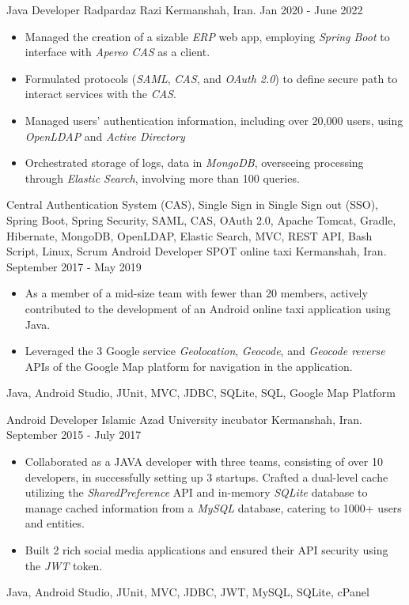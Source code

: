 \begin{experiences}
\experience
{}
{Java Developer}
{Radpardaz Razi}
{Kermanshah, Iran. \hspace{190 pt} Jan 2020 - June 2022}
{}
{
\begin{itemize}
\item Managed the creation of a sizable \emph{ERP} web app, employing \emph{Spring Boot} to interface with \emph{Apereo CAS} as a client.
\item Formulated protocols (\emph{SAML}, \emph{CAS}, and \emph{OAuth 2.0}) to define secure path to interact services with the \textit{CAS}.
\item Managed users' authentication information, including over 20,000 users, using \emph{OpenLDAP} and \emph{Active Directory}
\item Orchestrated storage of logs, data in \emph{MongoDB}, overseeing processing through \emph{Elastic Search}, involving more than 100 queries.
\end{itemize}
}
{Central Authentication System (CAS), Single Sign in Single Sign out (SSO), Spring Boot, Spring Security, SAML, CAS, OAuth 2.0, Apache Tomcat, Gradle, Hibernate, MongoDB, OpenLDAP, Elastic Search, MVC, REST API, Bash Script, Linux, Scrum}
\emptySeparator
\experience
  {}
  {Android Developer }
  {SPOT online taxi}
  {Kermanshah, Iran. \hspace{140 pt} September 2017 - May 2019}
  {}
  {
  \begin{itemize}
    \item As a member of a mid-size team with fewer than 20 members, actively contributed to the development of an Android online taxi application using Java.
    \item Leveraged the 3 Google service \emph{Geolocation}, \emph{Geocode}, and \emph{Geocode reverse} APIs of the Google Map platform for navigation in the application.
  \end{itemize}
  }
  {Java, Android Studio, JUnit, MVC, JDBC, SQLite, SQL, Google Map Platform}

\emptySeparator

\experience
{}
{Android Developer }
{Islamic Azad University incubator}
{Kermanshah, Iran. \hspace{60 pt} September 2015 - July 2017}
{}
{
\begin{itemize}
\item Collaborated as a JAVA developer with three teams, consisting of over 10 developers, in successfully setting up 3 startups.
Crafted a dual-level cache utilizing the \emph{SharedPreference} API and in-memory \emph{SQLite} database to manage cached information from a \emph{MySQL} database, catering to 1000+ users and entities.\item Built 2 rich social media applications and ensured their API security using the \emph{JWT} token.
\end{itemize}
}
{Java, Android Studio, JUnit, MVC, JDBC, JWT, MySQL, SQLite, cPanel}

\emptySeparator
\end{experiences}